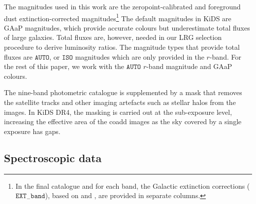 \documentclass{aa}
\numberwithin{equation}{section}
\newcommand{\mb}{\textcolor{brown}}
\begin{document}
The magnitudes used in this work are the zeropoint-calibrated and foreground dust extinction-corrected magnitudes\footnote{In the final catalogue and for each band, the Galactic extinction corrections ($\mathtt{EXT}_{-}\mathtt{band}$), based on \citet{schlegel98} and \citet{schlafly2011}, are provided in separate columns.}
The default magnitudes in KiDS are GAaP magnitudes, which provide accurate colours but underestimate total fluxes of large galaxies. Total fluxes are, however, needed in our LRG selection procedure to derive luminosity ratios.
The magnitude types that provide total fluxes are  $\mathtt{AUTO}$, or $\mathtt{ISO}$ magnitudes which are only provided in the $r$-band. For the rest of this paper, we work with the $\mathtt{AUTO}$ $r$-band magnitude and GAaP colours. 



The nine-band photometric catalogue is supplemented by a mask that removes the satellite tracks and other imaging artefacts such as stellar halos from the images. In KiDS DR4, the masking is carried out at the sub-exposure level, increasing the effective area of the coadd images as the sky covered by a single exposure has gaps. 

\subsection{Spectroscopic data}\label{sec:spec}
\end{document}
